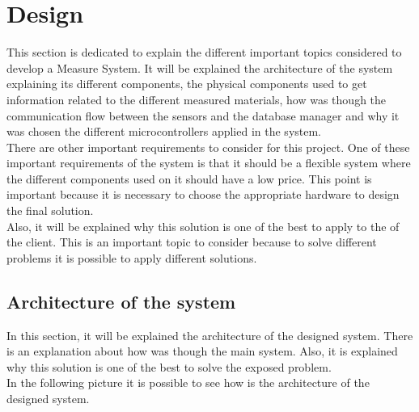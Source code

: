 
\chapter{Design}
\newpage

This section is dedicated to explain the different important topics considered to develop a Measure System. It will be explained the architecture of the system explaining its different components, the physical components used to get information related to the different measured materials, how was though the communication flow between the sensors and the database manager and why it was chosen the different microcontrollers applied in the system.\\

There are other important requirements to consider for this project. One of these important requirements of the system is that it should be a flexible system where the different components used on it should have a low price. This point is important because it is necessary to choose the appropriate hardware to design the final solution.\\

Also, it will be explained why this solution is one of the best to apply to the of the client. This is an important topic to consider because to solve different problems it is possible to apply different solutions.

\section{Architecture of the system}

In this section, it will be explained the architecture of the designed system. There is an explanation about how was though the main system. Also, it is explained why this solution is one of the best to solve the exposed problem.\\

In the following picture it is possible to see how is the architecture of the designed system.\\

